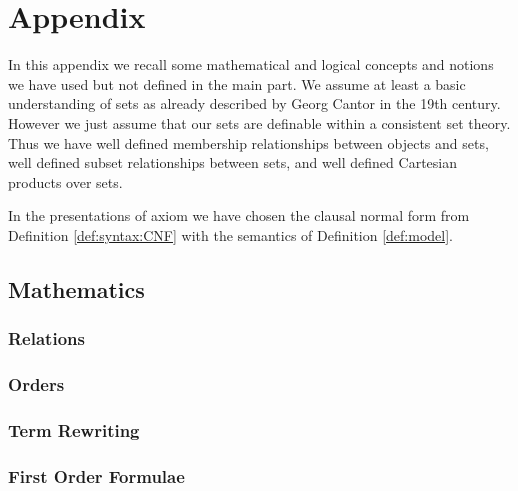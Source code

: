 

\chapter{Appendix}



In this appendix we recall some mathematical and logical concepts and notions 
we have used but not defined in the main part.
We assume at least a {\myem basic} understanding of sets as already 
described by Georg Cantor in the 19th century. 
However we just assume that our sets are definable within a consistent set theory.
Thus we have well defined {\myem membership} relationships between objects and sets,
well defined {\myem subset} relationships between sets, 
and well defined {\myem Cartesian products} over sets.

In the presentations of axiom we have chosen the clausal normal form from Definition \vref{def:syntax:CNF} 
with the semantics of Definition \vref{def:model}.

\section{Mathematics}\label{sec:app:mathematics}

\subsection{Relations}



\subsection{Orders}\label{sec:app:orders}



\subsection{Term Rewriting}



\subsection{First Order Formulae}



